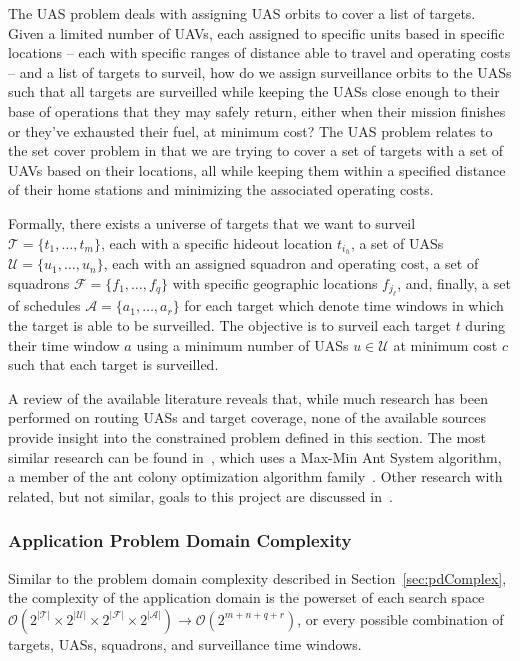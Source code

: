 \documentclass[conference]{IEEEtran}
\newcommand{\bigoh}[1]{\ensuremath{\mathcal{O}(#1)}}		%
\begin{document}
The UAS problem deals with assigning UAS orbits to cover a list of targets.
Given a limited number of UAVs, each assigned to specific units based in
specific locations -- each with specific ranges of distance able to travel and
operating costs -- and a list of targets to surveil, how do we assign
surveillance orbits to the UASs such that all targets are surveilled while
keeping the UASs close enough to their base of operations that they may safely
return, either when their mission finishes or they've exhausted their fuel, at
minimum cost?  The UAS problem relates to the set cover problem in that we are
trying to cover a set of targets with a set of UAVs based on their locations,
all while keeping them within a specified distance of their home stations and
minimizing the associated operating costs. 

Formally, there exists a universe of targets that we want to surveil
${\mathcal{T} = \lbrace t_1,\ldots,t_m \rbrace}$, each with a specific hideout
location $t_{i_h}$, a set of UASs ${\mathcal{U} = \lbrace u_1,\ldots,u_n
\rbrace}$, each with an assigned squadron and operating cost, a set of
squadrons ${\mathcal{F} = \lbrace f_1,\ldots,f_q \rbrace}$ with specific
geographic locations $f_{j_\ell}$, and, finally, a set of schedules
${\mathcal{A} = \lbrace a_1,\ldots,a_r \rbrace}$ for each target which denote
time windows in which the target is able to be surveilled. The objective is to
surveil each target $t$ during their time window $a$ using a minimum number of
UASs ${u \in \mathcal{U}}$ at minimum cost $c$ such that each target is
surveilled.

A review of the available literature reveals that, while much research has been
performed on routing UASs and target coverage, none of the available sources
provide insight into the constrained problem defined in this section. The most
similar research can be found in~\cite{karakaya2014}, which uses a Max-Min Ant
System algorithm, a member of the ant colony optimization algorithm
family~\cite{wiki:aco}. Other research with related, but not similar, goals to
this project are discussed in~\cite{avellar2015, caillouet2010, carlyle2007,
quintero2010, semsch2009, sundar2013}.

\subsubsection{Application Problem Domain Complexity}

Similar to the problem domain complexity described in
Section~\ref{sec:pdComplex}, the complexity of the application domain is the
powerset of each search space $\bigoh{2^{|\mathcal{T}|} \times
2^{|\mathcal{U}|} \times 2^{|\mathcal{F}|} \times 2^{|\mathcal{A}|}}
\rightarrow \bigoh{2^{m + n + q + r}}$, or every possible combination of
targets, UASs, squadrons, and surveillance time windows.
\end{document}
